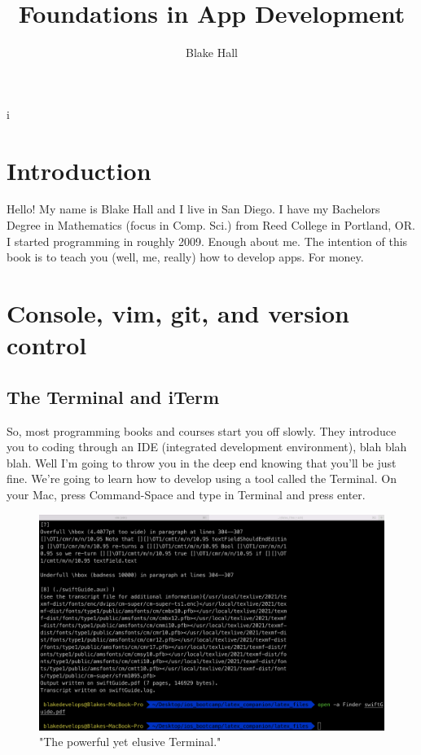 \documentclass[11pt, letterpaper]{article}
\title{Foundations in App Development}
\author{Blake Hall}
\begin{document}
i
\pagecolor{myBackgroundColor} 
\color{myMainTextColor} 

\maketitle{}

\section{Introduction}

Hello! My name is Blake Hall and I live in San Diego. I have my Bachelors Degree in Mathematics (focus in Comp. Sci.)
from Reed College in Portland, OR. I started programming in roughly 2009. Enough about me. The intention of this book 
is to teach you (well, me, really) how to develop apps. For money.

\section{Console, vim, git, and version control}

\subsection*{The Terminal and iTerm}

So, most programming books and courses start you off slowly. They introduce you to coding through an IDE (integrated
development environment), blah blah blah. Well I'm going to throw you in the deep end knowing that you'll be just fine.
We're going to learn how to develop using a tool called the Terminal. On your Mac, press Command-Space and type in 
Terminal and press enter. 

\begin{figure}[ht]
    \centering
        \includegraphics[scale=.12]{terminal_screenshot}
    \caption{"The powerful yet elusive Terminal."}
\end{figure}
\end{document}
